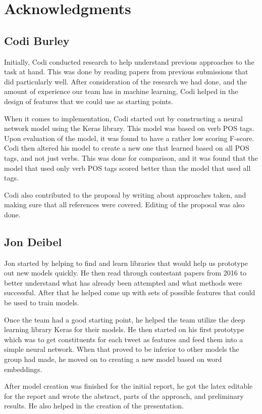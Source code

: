 \documentclass[11pt,letterpaper]{article}
\begin{document}
\section*{Acknowledgments}

\subsection{Codi Burley}
Initially, Codi conducted research to help understand previous approaches to the task at hand. This was done by reading papers from previous submissions that did particularly well. After consideration of the research we had done, and the amount of experience our team has in machine learning, Codi helped in the design of features that we could use as starting points.

When it comes to implementation, Codi started out by constructing a neural network model using the Keras library. This model was based on verb POS tags. Upon evaluation of the model, it was found to have a rather low scoring F-score. Codi then altered his model to create a new one that learned based on all POS tags, and not just verbs. This was done for comparison, and it was found that the model that used only verb POS tags scored better than the model that used all tags.

Codi also contributed to the proposal by writing about approaches taken, and making sure that all references were covered. Editing of the proposal was also done.



\subsection{Jon Deibel}
Jon started by helping to find and learn libraries that would help us prototype out new models quickly. He then read through contestant papers from 2016 to better understand what has already been attempted and what methods were successful. After that he helped come up with sets of possible features that could be used to train models.

Once the team had a good starting point, he helped the team utilize the deep learning library Keras for their models. He then started on his first prototype which was to get constituents for each tweet as features and feed them into a simple neural network. When that proved to be inferior to other models the group had made, he moved on to creating a new model based on word embeddings. 

After model creation was finished for the initial report, he got the latex editable for the report and wrote the abstract, parts of the approach, and preliminary results. He also helped in the creation of the presentation.
\end{document}
